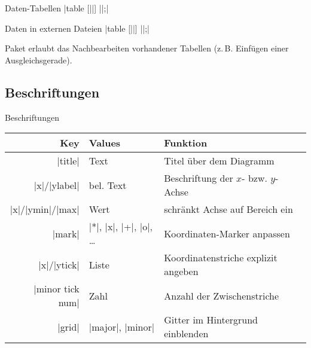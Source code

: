 \documentclass[
	vorläufig=true,
	datum=2016-12-02,
	titel={Diagramme},
	web=false,
]{../tex/latexkurs-slides}
\begin{document}
\begin{frame}[fragile,t]{Daten-Tabellen}
| table [||] {||};|
\vfill
\begin{LTXexample}[pos=r, explpreset={}, preset=\small, rframe={}]
\end{LTXexample}
\end{frame}


\begin{frame}[fragile,t]{Daten in externen Dateien}
| table [||] {||};|\vfill
\begin{LTXexample}[pos=r, explpreset={}, preset=\small, rframe={}]
\end{LTXexample}
\pause
Paket  erlaubt das Nachbearbeiten vorhandener Tabellen (z.\,B. Einfügen einer Ausgleichsgerade).
\end{frame}

\subsection{Beschriftungen}
\begin{frame}[fragile]{Beschriftungen}
\begin{tabular}{rll}
Key & Values & Funktion\\\midrule
|title| & Text & Titel über dem Diagramm\\
|x|/|ylabel| & bel. Text & Beschriftung der $x$- bzw. $y$-Achse  \\
|x|/|ymin|/|max| & Wert & schränkt Achse auf Bereich ein\\
|mark| & |*|, |x|, |+|, |o|, … & Koordinaten-Marker anpassen\\
|x|/|ytick| & Liste & Koordinatenstriche explizit angeben\\
|minor tick num| & Zahl & Anzahl der Zwischenstriche\\
|grid| & |major|, |minor| & Gitter im Hintergrund einblenden
\end{tabular}
\end{frame}
\end{document}
